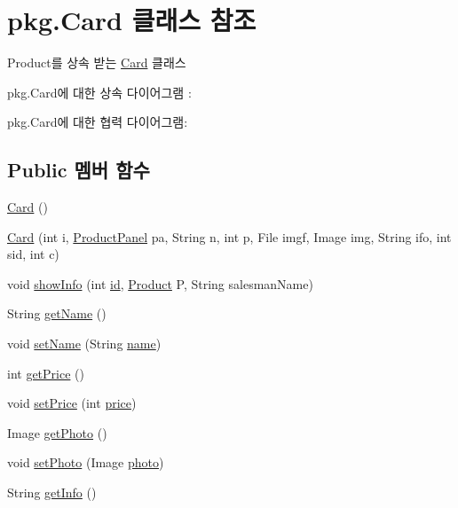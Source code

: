 \hypertarget{classpkg_1_1_card}{}\section{pkg.\+Card 클래스 참조}
\label{classpkg_1_1_card}


Product를 상속 받는 \hyperlink{classpkg_1_1_card}{Card} 클래스  




pkg.\+Card에 대한 상속 다이어그램 \+: 


pkg.\+Card에 대한 협력 다이어그램\+:
\subsection*{Public 멤버 함수}
\begin{DoxyCompactItemize}
\item 
\hyperlink{classpkg_1_1_card_a659b3195f850056be04037c521c22e0d}{Card} ()
\item 
\hyperlink{classpkg_1_1_card_a779d612231be55c31627c272c399480a}{Card} (int i, \hyperlink{classpkg_1_1_product_panel}{Product\+Panel} pa, String n, int p, File imgf, Image img, String ifo, int sid, int c)
\item 
void \hyperlink{classpkg_1_1_card_a20a4eeccc0bcc9ebe009be2b552b77db}{show\+Info} (int \hyperlink{classpkg_1_1_product_ac7846687b2d11faba3be1395fcbbab72}{id}, \hyperlink{classpkg_1_1_product}{Product} P, String salesman\+Name)
\item 
String \hyperlink{classpkg_1_1_product_a33ff6f7a51fc667ad2d2cc670424908c}{get\+Name} ()
\item 
void \hyperlink{classpkg_1_1_product_a9751f56879a4e8b76f958b26aaab4ec1}{set\+Name} (String \hyperlink{classpkg_1_1_product_acdadb9558664acdfd23eff5b2b77ae90}{name})
\item 
int \hyperlink{classpkg_1_1_product_af93b4414ec143311db57e6e4586d129e}{get\+Price} ()
\item 
void \hyperlink{classpkg_1_1_product_ad090e3760620ffe3fa253b169c84eb29}{set\+Price} (int \hyperlink{classpkg_1_1_product_a46c6eb6906d4ee2f6393515f41dba7c9}{price})
\item 
Image \hyperlink{classpkg_1_1_product_acb7237be160d1df9bcfda96a618f23dc}{get\+Photo} ()
\item 
void \hyperlink{classpkg_1_1_product_a2bb5fef6a450832b5d1c8121faeee53c}{set\+Photo} (Image \hyperlink{classpkg_1_1_product_a5d279eb4556860b90305cc26a3ee69be}{photo})
\item 
String \hyperlink{classpkg_1_1_product_a9609730b224bee5730f554067811446f}{get\+Info} ()

\end{DoxyCompactItemize}
